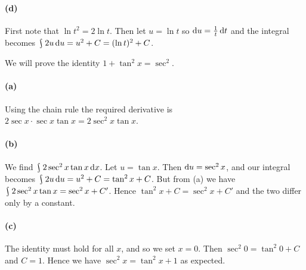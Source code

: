 \documentclass[answers]{exam}
\theoremstyle{definition}
\theoremstyle{break}
\DeclareMathOperator*{\rint}{\scalerel*{\rotatebox{17}{$\!\int\!$}}{\int}}
\begin{document}
\begin{questions}
\begin{solution}
    \paragraph{(d)} First note that $ \ln t^2 = 2\ln t $. Then let $ u = \ln t $ so $ \dif{u} = \frac{1}{t} \dif{t} $ and the
    integral becomes $ \rint 2u \dif{u} = u^2 + C = (\ln t)^2 + C $.
  \end{solution}

  \question We will prove the identity $ 1 + \tan^2 x = \sec^2 $.
  \begin{solution}
    \paragraph{(a)} Using the chain rule the required derivative is $ 2\sec x \cdot \sec x \tan x = 2 \sec^2 x \tan x $.
    \paragraph{(b)} We find $ \rint 2 \sec^2 x \tan x \dif{x} $. Let $ u = \tan x $. Then $ \dif{u} = \sec^2 x $,
    and our integral becomes $ \rint 2u \dif{u} = u^2 + C = \tan^2 x + C $. But from (a) we have $ \rint 2 \sec^2 x \tan x = \sec^2 x + C' $.
    Hence $ \tan^2 x + C = \sec^2 x + C' $ and the two differ only by a constant.
    \paragraph{(c)} The identity must hold for all $ x $, and so we set $ x = 0 $. Then $ \sec^2 0 = \tan^2 0 + C $ and $ C = 1 $. Hence
    we have $ \sec^2 x = \tan^2 x + 1 $ as expected.
  \end{solution}


\end{questions}
\end{document}
